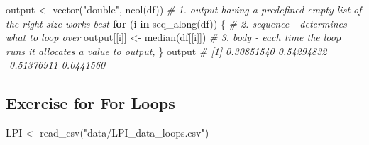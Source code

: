 \documentclass[
]{book}
\newenvironment{Shaded}{\begin{snugshade}}{\end{snugshade}}
\newcommand{\CommentTok}[1]{\textcolor[rgb]{0.56,0.35,0.01}{\textit{#1}}}
\newcommand{\ControlFlowTok}[1]{\textcolor[rgb]{0.13,0.29,0.53}{\textbf{#1}}}
\newcommand{\FunctionTok}[1]{\textcolor[rgb]{0.00,0.00,0.00}{#1}}
\newcommand{\NormalTok}[1]{#1}
\newcommand{\OtherTok}[1]{\textcolor[rgb]{0.56,0.35,0.01}{#1}}
\newcommand{\StringTok}[1]{\textcolor[rgb]{0.31,0.60,0.02}{#1}}
\begin{document}
\begin{Shaded}
\begin{Highlighting}[]
\NormalTok{output }\OtherTok{\textless{}{-}} \FunctionTok{vector}\NormalTok{(}\StringTok{"double"}\NormalTok{, }\FunctionTok{ncol}\NormalTok{(df))  }\CommentTok{\# 1. output having a predefined empty list of the right size works best}
\ControlFlowTok{for}\NormalTok{ (i }\ControlFlowTok{in} \FunctionTok{seq\_along}\NormalTok{(df)) \{            }\CommentTok{\# 2. sequence {-} determines what to loop over}
\NormalTok{  output[[i]] }\OtherTok{\textless{}{-}} \FunctionTok{median}\NormalTok{(df[[i]])      }\CommentTok{\# 3. body {-} each time the loop runs it allocates a value to output, }
\NormalTok{\}}
\NormalTok{output}
\CommentTok{\# [1]  0.30851540  0.54294832 {-}0.51376911  0.0441560}
\end{Highlighting}
\end{Shaded}

\hypertarget{exercise-for-for-loops}{%
\subsection{Exercise for For Loops}\label{exercise-for-for-loops}}

\begin{Shaded}
\begin{Highlighting}[]
\NormalTok{LPI }\OtherTok{\textless{}{-}} \FunctionTok{read\_csv}\NormalTok{(}\StringTok{"data/LPI\_data\_loops.csv"}\NormalTok{)}
\end{Highlighting}
\end{Shaded}
\end{document}
